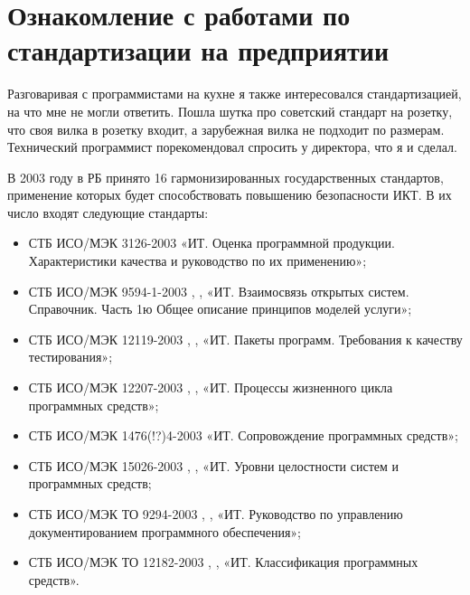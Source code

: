 \newpage
\section{Ознакомление с работами по стандартизации на предприятии}

Разговаривая с программистами на кухне я также интересовался стандартизацией,
на что мне не могли ответить.
Пошла шутка про советский стандарт на розетку, что своя вилка в розетку входит,
а зарубежная вилка не подходит по размерам.
Технический программист порекомендовал спросить у директора, что я и сделал.

В 2003 году в РБ принято 16 гармонизированных государственных
стандартов, применение которых будет способствовать повышению
безопасности ИКТ. В их число входят следующие стандарты:

\begin{itemize}
  \item СТБ ИСО/МЭК 3126-2003
  «ИТ. Оценка программной продукции.
  Характеристики качества и руководство по их применению»;

  \item СТБ ИСО/МЭК 9594-1-2003
  \cite{STB_9594_1_2003_tnpa}, \cite{STB_9594_1_2003_belgiss}, \cite{STB_9594_1_2003_gostinfo}
  «ИТ. Взаимосвязь открытых систем.
  Справочник. Часть 1ю Общее описание принципов моделей услуги»;

  \item СТБ ИСО/МЭК 12119-2003
  \cite{STB_12119_2003_tnpa}, \cite{STB_12119_2003_belgiss}, \cite{STB_12119_2003_gostinfo}
  «ИТ. Пакеты программ. Требования к качеству тестирования»;

  \item СТБ ИСО/МЭК 12207-2003
  \cite{STB_12207_2003_tnpa}, \cite{STB_12207_2003_belgiss}, \cite{STB_12207_2003_gostinfo}
  «ИТ. Процессы жизненного цикла программных средств»;

  \item СТБ ИСО/МЭК 1476(!?)4-2003
  «ИТ. Сопровождение программных средств»;

  \item СТБ ИСО/МЭК 15026-2003
  \cite{STB_15026_2003_tnpa}, \cite{STB_15026_2003_belgiss}, \cite{STB_15026_2003_gostinfo}
  «ИТ. Уровни целостности систем и программных средств;
  
  \item СТБ ИСО/МЭК ТО 9294-2003
  \cite{STB_9294_2003_tnpa}, \cite{STB_9294_2003_belgiss}, \cite{STB_9424_2003_gostinfo}
  «ИТ. Руководство по управлению документированием программного обеспечения»;

  \item СТБ ИСО/МЭК ТО 12182-2003
  \cite{STB_9294_2003_tnpa}, \cite{STB_12182_2003_belgiss}, \cite{STB_12182_2003_gostinfo}
  «ИТ. Классификация программных средств».
\end{itemize}

